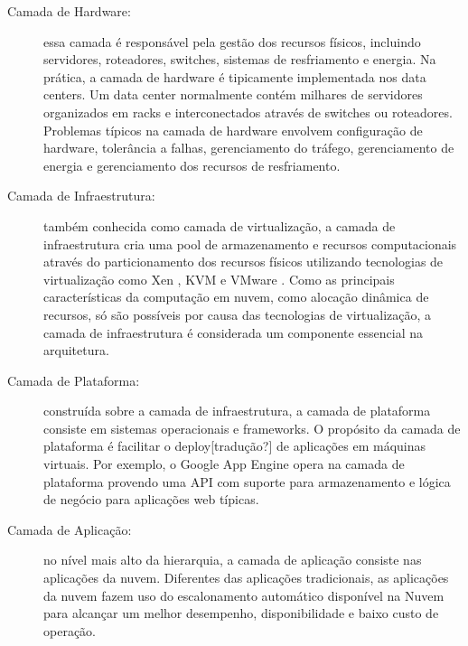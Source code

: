 \begin{description}

	\item[Camada de Hardware:] essa camada é responsável pela gestão dos
            recursos físicos, incluindo servidores, roteadores, switches,
            sistemas de resfriamento e energia. Na prática, a camada de
            hardware é tipicamente implementada nos data centers. Um data
            center normalmente contém milhares de servidores organizados em racks e interconectados através de switches ou roteadores. Problemas típicos na camada de hardware envolvem configuração de hardware, tolerância a falhas, gerenciamento do tráfego, gerenciamento de energia e gerenciamento dos recursos de resfriamento.

	\item[Camada de Infraestrutura:] também conhecida como camada de
            virtualização, a camada de infraestrutura cria uma pool de
            armazenamento e recursos computacionais através do particionamento
            dos recursos físicos utilizando tecnologias de virtualização como
            Xen \cite{Xen:Online}, KVM \cite{KVM:Online} e VMware
            \cite{VMware:Online}. Como as principais características da computação em nuvem, como alocação dinâmica de recursos, só são possíveis por causa das tecnologias de virtualização, a camada de infraestrutura é considerada um componente essencial na arquitetura.

	\item[Camada de Plataforma:] construída sobre a camada de
            infraestrutura, a camada de plataforma consiste em sistemas
            operacionais e frameworks. O propósito da camada de plataforma é
            facilitar o deploy[tradução?] de aplicações em
            máquinas virtuais. Por exemplo, o Google App Engine opera na camada de plataforma provendo uma API com suporte para armazenamento e lógica de negócio para aplicações web típicas. 

	\item[Camada de Aplicação:] no nível mais alto da hierarquia, a camada
            de aplicação consiste nas aplicações da nuvem. Diferentes das
            aplicações tradicionais, as aplicações da nuvem fazem uso do
            escalonamento automático disponível na Nuvem para alcançar um melhor desempenho, disponibilidade e baixo custo de operação.

\end{description}


